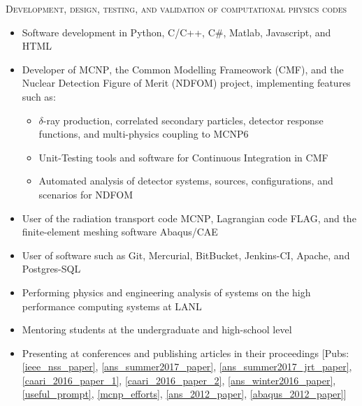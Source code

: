 \begin{center}
	\begin{minipage}{0.99\textwidth}
		\begin{center}
			\textsc{\Large Development, design, testing, and validation of computational physics codes} \vspace{2mm}
		\end{center}
	\end{minipage}
\end{center}
\begin{minipage}{\textwidth}
	\begin{center}
		\begin{itemize}
			\item Software development in Python, C/C++, C\#, Matlab, Javascript, and HTML
			\item Developer of \textsc{MCNP}, the Common Modelling Frameowork (\textsc{CMF}), and the Nuclear Detection Figure of Merit (\textsc{NDFOM}) project, implementing features such as: \vspace{2mm}
			\begin{itemize}
				\item $\delta$-ray production, correlated secondary particles, detector response functions, and multi-physics coupling to \textsc{MCNP6} 
				\item Unit-Testing tools and software for Continuous Integration in \textsc{CMF}
				\item Automated analysis of detector systems, sources, configurations, and scenarios for \textsc{NDFOM}
			\end{itemize}
			\item User of the radiation transport code \textsc{MCNP}, Lagrangian code \textsc{FLAG}, and the finite-element meshing software Abaqus/CAE
			\item User of software such as Git, Mercurial, BitBucket, Jenkins-CI, Apache, and Postgres-SQL
			\item Performing physics and engineering analysis of systems on the high performance computing systems at LANL
			\item Mentoring students at the undergraduate and high-school level
			\item Presenting at conferences and publishing articles in their proceedings [Pubs: \ref{ieee_nss_paper}, \ref{ans_summer2017_paper}, \ref{ans_summer2017_jrt_paper}, \ref{caari_2016_paper_1}, \ref{caari_2016_paper_2}, \ref{ans_winter2016_paper}, \ref{useful_prompt}, \ref{mcnp_efforts}, \ref{ans_2012_paper}, \ref{abaqus_2012_paper}]
		\end{itemize}
	\end{center}
\end{minipage}


